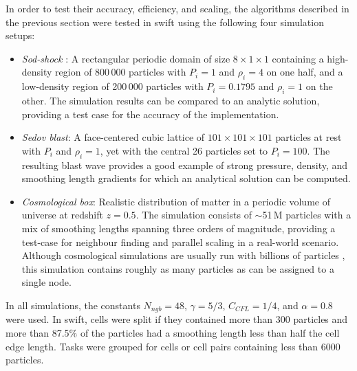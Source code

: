 \documentclass[final]{siamltex}
\newcommand{\swift}
    {{\sc swift}\xspace}
\begin{document}
In order to test their accuracy, efficiency, and scaling,
the algorithms described in the previous section
were tested in \swift using the following four
simulation setups:
%
\begin{itemize}
    \item {\em Sod-shock} \cite{ref:Sod1978}: A rectangular periodic
        domain of size $8\times 1 \times 1$ containing a
        high-density region of
        800\,000 particles with $P_i=1$ and $\rho_i=4$ on one half,
        and a low-density region of 200\,000
        particles with $P_i=0.1795$ and $\rho_i=1$ on the other.
        The simulation results can be compared to an analytic
        solution, providing a test case for the accuracy of the
        implementation.
    \item {\em Sedov blast}: A face-centered cubic lattice of
        $101\times 101\times 101$
        particles at rest with $P_i$ and $\rho_i=1$, yet with the
        central 26 particles set to
        $P_i=100$.
        The resulting blast wave provides a good example of
        strong pressure, density, and smoothing length gradients
        for which an analytical solution can be computed.
    \item {\em Cosmological box}: Realistic distribution of matter
        in a periodic volume of universe at redshift $z=0.5$.
        The simulation consists
        of $\sim$51\,M particles with
        a mix of smoothing lengths spanning three orders of magnitude,
        providing a test-case for neighbour finding and parallel
        scaling in a real-world scenario.
        Although cosmological simulations are usually run with
        billions of particles \cite{ref:Lemson2006}, this simulation
        contains roughly as many particles as can be assigned to a
        single node.
\end{itemize}
%
In all simulations, the constants $N_{ngb}=48$, $\gamma=5/3$,
$C_{CFL}=1/4$, and $\alpha = 0.8$ were used.
In \swift, cells were split if they contained more than 300
particles and more than 87.5\% of the particles had a smoothing
length less than half the cell edge length.
Tasks were grouped for cells or cell pairs containing less than
6000 particles.
\end{document}
